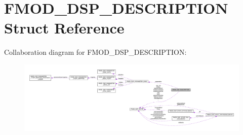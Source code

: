 \hypertarget{structFMOD__DSP__DESCRIPTION}{}\section{F\+M\+O\+D\+\_\+\+D\+S\+P\+\_\+\+D\+E\+S\+C\+R\+I\+P\+T\+I\+ON Struct Reference}
\label{structFMOD__DSP__DESCRIPTION}


Collaboration diagram for F\+M\+O\+D\+\_\+\+D\+S\+P\+\_\+\+D\+E\+S\+C\+R\+I\+P\+T\+I\+ON\+:
\nopagebreak
\begin{figure}[H]
\begin{center}
\leavevmode
\includegraphics[width=350pt]{structFMOD__DSP__DESCRIPTION__coll__graph}
\end{center}
\end{figure}
